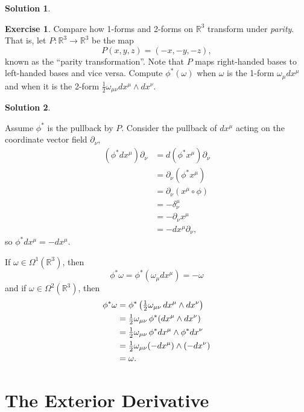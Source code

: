 \documentclass[11pt, a4paper]{report}
\theoremstyle{definition}
\newtheorem{exercise}{Exercise}[part]
\newtheorem{solution}{Solution}[part]
\newenvironment{ex}{\begin{exercise}}{\end{exercise}\pagebreak[1]}
\newenvironment{sol}{\begin{solution}}{\end{solution}\pagebreak[3]}
\renewcommand*{\d}{\ensuremath\mathop{}\mathopen{}d}
\begin{document}
\begin{sol}
\end{sol}

\begin{ex}

Compare how 1-forms and 2-forms on $\mathbb{R}^3$ transform under \emph{parity}. That is, let $P: \mathbb{R}^3 \to \mathbb{R}^3$ be the map
\[
    P(x, y, z) = (-x, -y, -z),
\]
known as the ``parity transformation''. Note that $P$ maps right-handed bases to left-handed bases and vice versa. Compute $\phi^*(\omega)$ when $\omega$ is the 1-form $\omega_\mu dx^\mu$ and when it is the 2-form $\frac{1}{2}\omega_{\mu\nu}dx^\mu \wedge dx^\nu$.

\end{ex}

\begin{sol}\label{sol:parity1form2form}

Assume $\phi^*$ is the pullback by $P$. Consider the pullback of $dx^\mu$ acting on the coordinate vector field $\partial_\nu$,
\begin{align*}
    (\phi^* dx^\mu) \partial_\nu &= d(\phi^* x^\mu) \partial_\nu \\
        &= \partial_\nu (\phi^* x^\mu) \\
        &= \partial_\nu (x^\mu \circ \phi) \\
        &= -\delta_\nu^\mu \\
        &= -\partial_\nu x^\mu \\
        &= - dx^\mu \partial_\nu,
\end{align*}
so $\phi^* dx^\mu = -dx^\mu$.

If $\omega \in \Omega^1(\mathbb{R}^3)$, then
\[
    \phi^* \omega = \phi^*(\omega_\mu dx^\mu) = -\omega
\]
and if $\omega \in \Omega^2(\mathbb{R}^3)$, then
\begin{align*}
    \phi^* \omega &= \phi^*\left(\tfrac{1}{2}\omega_{\mu\nu} \d x^\mu \wedge dx^\nu\right) \\
        &= \tfrac{1}{2}\omega_{\mu\nu} \, \phi^*(dx^\mu \wedge dx^\nu) \\
        &= \tfrac{1}{2}\omega_{\mu\nu} \, \phi^* dx^\mu \wedge \phi^* dx^\nu \\
        &= \tfrac{1}{2}\omega_{\mu\nu} (-dx^\mu) \wedge (-dx^\nu) \\
        &= \omega.
\end{align*}

\end{sol}

\section{The Exterior Derivative}
\end{document}
